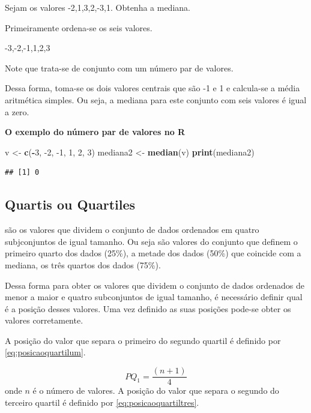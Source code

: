 \documentclass[
]{book}
\newenvironment{Shaded}{\begin{snugshade}}{\end{snugshade}}
\newcommand{\DecValTok}[1]{\textcolor[rgb]{0.00,0.00,0.81}{#1}}
\newcommand{\KeywordTok}[1]{\textcolor[rgb]{0.13,0.29,0.53}{\textbf{#1}}}
\newcommand{\NormalTok}[1]{#1}
\newcommand{\OperatorTok}[1]{\textcolor[rgb]{0.81,0.36,0.00}{\textbf{#1}}}
\newcommand{\StringTok}[1]{\textcolor[rgb]{0.31,0.60,0.02}{#1}}
\begin{document}
Sejam os valores -2,1,3,2,-3,1. Obtenha a mediana.

Primeiramente ordena-se os seis valores.

-3,-2,-1,1,2,3

Note que trata-se de conjunto com um número par de valores.

Dessa forma, toma-se os dois valores centrais que são -1 e 1 e calcula-se a média aritmética simples. Ou seja, a mediana para este conjunto com seis valores é igual a zero.

\textbf{O exemplo do número par de valores no R}

\begin{Shaded}
\begin{Highlighting}[]
\NormalTok{v <-}\StringTok{ }\KeywordTok{c}\NormalTok{(}\OperatorTok{-}\DecValTok{3}\NormalTok{, }\DecValTok{-2}\NormalTok{, }\DecValTok{-1}\NormalTok{, }\DecValTok{1}\NormalTok{, }\DecValTok{2}\NormalTok{, }\DecValTok{3}\NormalTok{)}
\NormalTok{mediana2 <-}\StringTok{ }\KeywordTok{median}\NormalTok{(v)}
\KeywordTok{print}\NormalTok{(mediana2)}
\end{Highlighting}
\end{Shaded}

\begin{verbatim}
## [1] 0
\end{verbatim}

\hypertarget{quartis-ou-quartiles}{%
\subsection{Quartis ou Quartiles}\label{quartis-ou-quartiles}}

são os valores que dividem o conjunto de dados ordenados em quatro subjconjuntos
de igual tamanho. Ou seja são valores do conjunto que definem o primeiro quarto
dos dados (25\%), a metade dos dados (50\%) que coincide com a mediana, os três
quartos dos dados (75\%).

Dessa forma para obter os valores que dividem o conjunto de dados ordenados de menor a maior e quatro subconjuntos de igual tamanho, é necessário definir qual é a posição desses valores. Uma vez definido as suas posições pode-se obter os valores corretamente.

A posição do valor que separa o primeiro do segundo quartil é definido por \eqref{eq:posicaoquartilum}.

\begin{equation}
  PQ_1 = \dfrac{(n +1)}{4}
  \label{eq:posicaoquartilum}
\end{equation}
onde \(n\) é o número de valores.
A posição do valor que separa o segundo do terceiro quartil é definido por \eqref{eq:posicaoquartiltres}.
\end{document}
